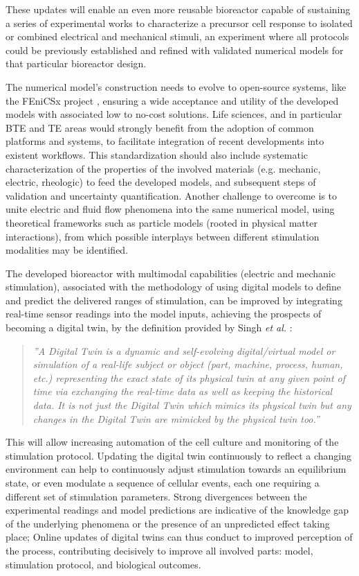 These updates will enable an even more reusable bioreactor capable of sustaining a series of experimental works to characterize a precursor cell response to isolated or combined electrical and mechanical stimuli, an experiment where all protocols could be previously established and refined with validated numerical models for that particular bioreactor design.    

The numerical model's construction needs to evolve to open-source systems, like the FEniCSx project \cite{Logg2012-yy}, ensuring a wide acceptance and utility of the developed models with associated low to no-cost solutions. Life sciences, and in particular \acs{BTE} and \acs{TE} areas would strongly benefit from the adoption of common platforms and systems, to facilitate integration of recent developments into existent workflows. This standardization should also include systematic characterization of the properties of the involved materials (e.g. mechanic, electric, rheologic) to feed the developed models, and subsequent steps of validation and uncertainty quantification. Another challenge to overcome is to unite electric and fluid flow phenomena into the same numerical model, using theoretical frameworks such as particle models (rooted in physical matter interactions), from which possible interplays between different stimulation modalities may be identified.

The developed bioreactor with multimodal capabilities (electric and mechanic stimulation), associated with the methodology of using digital models to define and predict the delivered ranges of stimulation, can be improved by integrating real-time sensor readings into the model inputs, achieving the prospects of becoming a digital twin, by the definition provided by Singh \textit{et al.} \cite{Singh2021-ij}:

 \begin{quotation}
\textit{''A Digital Twin is a dynamic and self-evolving digital/virtual model or simulation of a real-life subject or object (part, machine, process, human, etc.) representing the exact state of its physical twin at any given point of time via exchanging the real-time data as well as keeping the historical data. It is not just the Digital Twin which mimics its physical twin but any changes in the Digital Twin are mimicked by the physical twin too.''}
 \end{quotation}
 
This will allow increasing automation of the cell culture and monitoring of the stimulation protocol. Updating the digital twin continuously to reflect a changing environment can help to continuously adjust stimulation towards an equilibrium state, or even modulate a sequence of cellular events, each one requiring a different set of stimulation parameters. Strong divergences between the experimental readings and model predictions are indicative of the knowledge gap of the underlying phenomena or the presence of an unpredicted effect taking place; Online updates of digital twins can thus conduct to improved perception of the process, contributing decisively to improve all involved parts: model, stimulation protocol, and biological outcomes.    




